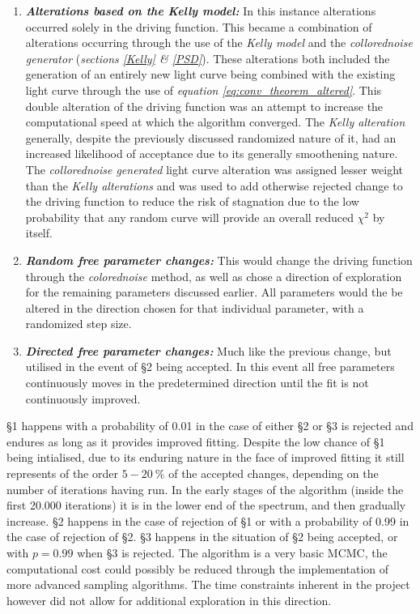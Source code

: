 \documentclass[a4paper, 12pt, twoside]{article}
\begin{document}
\begin{enumerate}
\item {\bf \emph{Alterations based on the Kelly model:}} In this instance alterations occurred solely in the driving function. This became a combination of alterations occurring through the use of the \emph{Kelly model} and the \emph{collorednoise generator} (\emph{sections \ref{Kelly} \& \ref{PSD}}). These alterations both included the generation of an entirely new light curve being combined with the existing light curve through the use of \emph{equation \ref{eq:conv_theorem_altered}}. This double alteration of the driving function was an attempt to increase the computational speed at which the algorithm converged. The \emph{Kelly alteration} generally, despite the previously discussed randomized nature of it, had an increased likelihood of acceptance due to its generally smoothening nature. The \emph{collorednoise generated} light curve alteration was assigned lesser weight than the \emph{Kelly alterations} and was used to add otherwise rejected change to the driving function to reduce the risk of stagnation due to the low probability that any random curve will provide an overall reduced $\chi^{2}$ by itself. 
\item {\bf \emph{Random free parameter changes:}} This would change the driving function through the \emph{colorednoise} method, as well as chose a direction of exploration for the remaining parameters discussed earlier. All parameters would the be altered in the direction chosen for that individual parameter, with a randomized step size.
\item {\bf \emph{Directed free parameter changes:}} Much like the previous change, but utilised in the event of §2 being accepted. In this event all free parameters continuously moves in the predetermined direction until the fit is not continuously improved. 
\end{enumerate}
§1 happens with a probability of 0.01 in the case of either §2 or §3 is rejected and endures as long as it provides improved fitting. Despite the low chance of §1 being intialised, due to its enduring nature in the face of improved fitting it still represents of the order $5-20\ \%$ of the accepted changes, depending on the number of iterations having run. In the early stages of the algorithm (inside the first 20.000 iterations) it is in the lower end of the spectrum, and then gradually increase. §2 happens in the case of rejection of §1 or with a probability of 0.99 in the case of rejection of §2. §3 happens in the situation of §2 being accepted, or with $p=0.99$ when §3 is rejected. The algorithm is a very basic MCMC, the computational cost could possibly be reduced through the implementation of more advanced sampling algorithms. The time constraints inherent in the project however did not allow for additional exploration in this direction. \\
\end{document}
